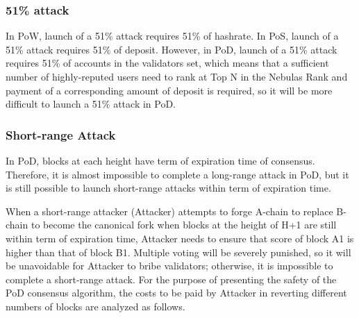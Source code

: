 
\subsubsection*{51\% attack}
\label{pod:economic:fraud:51attack}

In PoW, launch of a 51\% attack requires 51\% of hashrate. In PoS, launch of a 51\% attack requires 51\% of deposit. However, in PoD, launch of a 51\% attack requires 51\% of accounts in the validators set, which means that a sufficient number of highly-reputed users need to rank at Top N in the Nebulas Rank and payment of a corresponding amount of deposit is required, so it will be more difficult to launch a 51\% attack in PoD.


\subsubsection*{Short-range Attack}
\label{pod:economic:fraud:short_range_attack}

In PoD, blocks at each height have term of expiration time of consensus. Therefore, it is almost impossible to complete a long-range attack in PoD, but it is still possible to launch short-range attacks within term of expiration time.


When a short-range attacker (Attacker) attempts to forge A-chain to replace B-chain to become the canonical fork when blocks at the height of H+1 are still within term of expiration time, Attacker needs to ensure that score of block A1 is higher than that of block B1. Multiple voting will be severely punished, so it will be unavoidable for Attacker to bribe validators; otherwise, it is impossible to complete a short-range attack. For the purpose of presenting the safety of the PoD consensus algorithm, the costs to be paid by Attacker in reverting different numbers of blocks are analyzed as follows.

